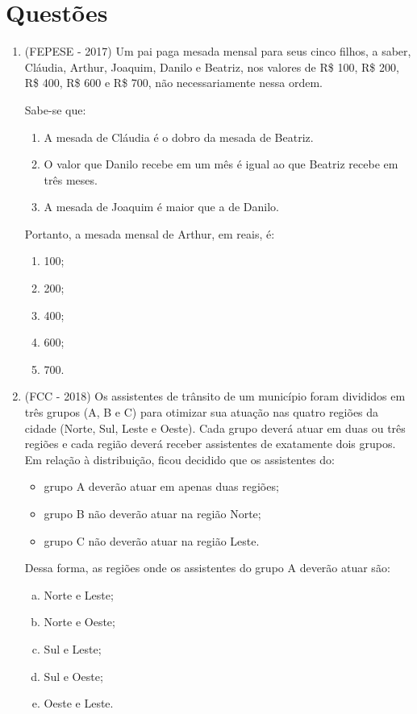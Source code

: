\section{Questões}

\begin{enumerate}
 \item (FEPESE - 2017) Um pai paga mesada mensal para seus cinco filhos, a saber, Cláudia, Arthur, Joaquim, Danilo e Beatriz, nos valores de R\$ 100, R\$ 200, R\$ 400, R\$ 600 e R\$ 700, não necessariamente nessa ordem.

Sabe-se que:
\begin{enumerate}[1.]
\item A mesada de Cláudia é o dobro da mesada de Beatriz.
\item O valor que Danilo recebe em um mês é igual ao que Beatriz recebe em três meses.
\item A mesada de Joaquim é maior que a de Danilo.
\end{enumerate}
Portanto, a mesada mensal de Arthur, em reais, é:
\begin{multicols}{5}
\begin{enumerate}
\item 100;
\item 200;
\item 400;
\item 600;
\item 700.
\end{enumerate}
\end{multicols}

\item (FCC - 2018) Os assistentes de trânsito de um município foram divididos em três grupos (A, B e C) para otimizar sua atuação nas quatro regiões da cidade (Norte, Sul, Leste e Oeste). Cada grupo deverá atuar em duas ou três regiões e cada região deverá receber assistentes de exatamente dois grupos. Em relação à distribuição, ficou decidido que os assistentes do:
\begin{itemize}
 \item grupo A deverão atuar em apenas duas regiões;
 \item grupo B não deverão atuar na região Norte;
 \item grupo C não deverão atuar na região Leste.
\end{itemize}
Dessa forma, as regiões onde os assistentes do grupo A deverão atuar são:
\begin{multicols}{2}
\begin{enumerate}[a)]
\item Norte e Leste;
\item Norte e Oeste;
\item Sul e Leste;
\item Sul e Oeste;
\item Oeste e Leste.
\end{enumerate}
\end{multicols}


\end{enumerate}
